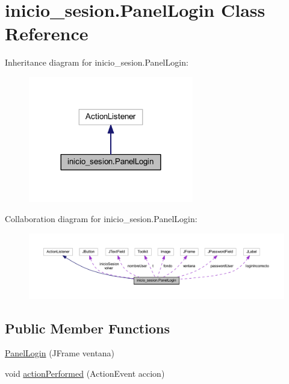 \hypertarget{classinicio__sesion_1_1_panel_login}{}\section{inicio\+\_\+sesion.\+Panel\+Login Class Reference}
\label{classinicio__sesion_1_1_panel_login}


Inheritance diagram for inicio\+\_\+sesion.\+Panel\+Login\+:
\nopagebreak
\begin{figure}[H]
\begin{center}
\leavevmode
\includegraphics[width=204pt]{classinicio__sesion_1_1_panel_login__inherit__graph}
\end{center}
\end{figure}


Collaboration diagram for inicio\+\_\+sesion.\+Panel\+Login\+:
\nopagebreak
\begin{figure}[H]
\begin{center}
\leavevmode
\includegraphics[width=350pt]{classinicio__sesion_1_1_panel_login__coll__graph}
\end{center}
\end{figure}
\subsection*{Public Member Functions}
\begin{DoxyCompactItemize}
\item 
\mbox{\hyperlink{classinicio__sesion_1_1_panel_login_a8e69cf4d5de3ffa8d3c2207bb928c9ff}{Panel\+Login}} (J\+Frame ventana)
\item 
void \mbox{\hyperlink{classinicio__sesion_1_1_panel_login_af8ed1b52e53779554e00710147e8928b}{action\+Performed}} (Action\+Event accion)
\end{DoxyCompactItemize}


